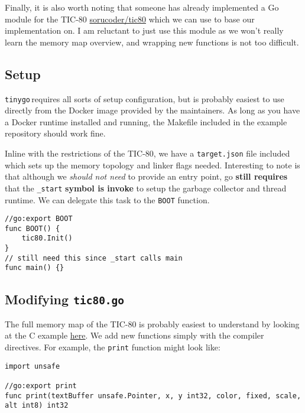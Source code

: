 \documentclass{article}
\newcommand{\tinygo}{\texttt{tinygo}\,}
\begin{document}
Finally, it is also worth noting that someone has already implemented a Go module for the TIC-80 \href{https://github.com/sorucoder/tic80/blob/master/tic80.go}{sorucoder/tic80} which we can use to base our implementation on. I am reluctant to just use this module as we won't really learn the memory map overview, and wrapping new functions is not too difficult.


\subsection{Setup}

\tinygo requires all sorts of setup configuration, but is probably easiest to use directly from the Docker image provided by the maintainers. As long as you have a Docker runtime installed and running, the Makefile included in the example repository should work fine.

Inline with the restrictions of the TIC-80, we have a \lstinline|target.json| file included which sets up the memory topology and linker flags needed. Interesting to note is that although we \textit{should not need} to provide an entry point, go \textbf{still requires} that the \lstinline|_start| \textbf{symbol is invoke} to setup the garbage collector and thread runtime. We can delegate this task to the \lstinline|BOOT| function.
\\
\begin{lstlisting}
//go:export BOOT
func BOOT() {
    tic80.Init()
}
// still need this since _start calls main
func main() {}
\end{lstlisting}

\subsection{Modifying \texttt{tic80.go}}

The full memory map of the TIC-80 is probably easiest to understand by looking at the C example \href{https://github.com/nesbox/TIC-80/blob/main/templates/c/src/tic80.h}{here}. We add new functions simply with the compiler directives. For example, the \lstinline|print| function might look like:
\\
\begin{lstlisting}
import unsafe

//go:export print
func print(textBuffer unsafe.Pointer, x, y int32, color, fixed, scale, alt int8) int32
\end{lstlisting}
\end{document}

